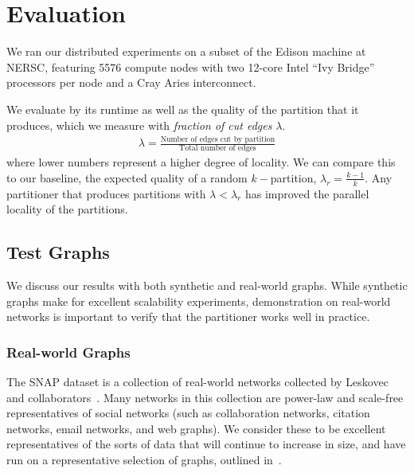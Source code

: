 \section{Evaluation}
We ran our distributed experiments on a subset of the Edison machine at NERSC, featuring 5576 compute nodes with two 12-core Intel ``Ivy Bridge'' processors per node and a Cray Aries interconnect. 

We evaluate \ourmethod by its runtime as well as the quality of the partition that it produces, which we measure with \textit{fraction of cut edges} $\lambda$.
\begin{align}\lambda = \frac{\text{Number of edges cut by partition}}{\text{Total number of edges}}\end{align} where lower numbers represent a higher degree of locality. We can compare this to our baseline, the expected quality of a random $k-$partition, $\lambda_r = \frac{k-1}{k}$. Any partitioner that produces partitions with $\lambda < \lambda_r$ has improved the parallel locality of the partitions.


\subsection{Test Graphs}
We discuss our results with both synthetic and real-world graphs. While synthetic graphs make for excellent scalability experiments, demonstration on real-world networks is important to verify that the partitioner works well in practice. 

\subsubsection{Real-world Graphs}
The SNAP dataset is a collection of real-world networks collected by Leskovec and collaborators~\cite{Leskovec-data, snapnets}. 
Many networks in this collection are power-law and scale-free representatives of social networks (such as collaboration networks, citation networks, email networks, and web graphs). We consider these to be excellent representatives of the sorts of data that will continue to increase in size, and have run \ourmethod on a representative selection of graphs, outlined in~.

